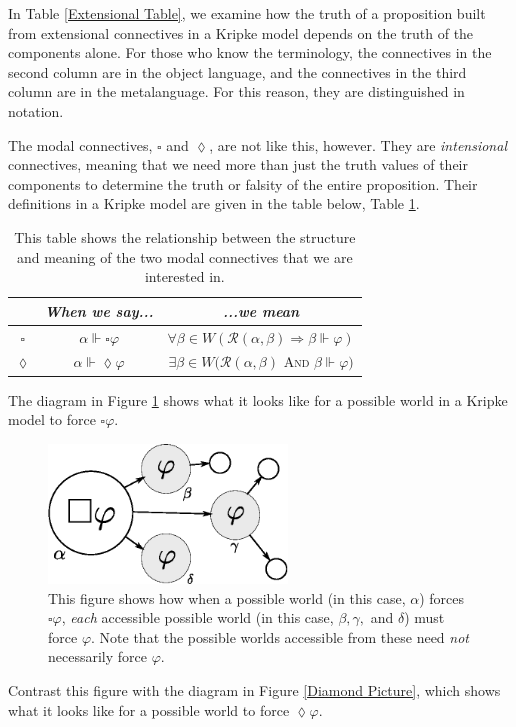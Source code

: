 \documentclass[12pt]{article}
\renewcommand{\phi}{\varphi}
\DeclareMathOperator{\forces}{\Vdash}
\begin{document}
In Table \ref{Extensional Table}, we examine how the truth of a proposition built from extensional connectives in a Kripke model depends on the
truth of the components alone. For those who know the terminology, the connectives in the second column are in the object language,
and the connectives in the third column are in the metalanguage. For this reason, they are distinguished in notation.

\bigskip

The modal connectives, $\square$ and $\lozenge$, are not like this, however. They are \emph{intensional} connectives, meaning that we need more than
just the truth values of their components to determine the truth or falsity of the entire proposition. Their definitions in a Kripke model are given
in the table below, Table \ref{Intensional Table}.

\begin{table}[h]
    \centering
    \begin{tabular}{| c | c | c |}
        \hline
        & \emph{When we say...}& \emph{...we mean} \\
        \hline
        $\square$ & $\alpha \forces \square \phi$ & $\forall \beta \in W(\mathcal{R}(\alpha, \beta) \Rightarrow \beta \forces \phi)$ \\
        \hline
        $\lozenge$ & $\alpha \forces \lozenge \phi$ & $\exists \beta \in W(\mathcal{R}(\alpha, \beta)$ \textsc{And} $\beta \forces \phi)$ \\
        \hline
    \end{tabular}
    \caption{This table shows the relationship between the structure and meaning of the two modal connectives that we are interested in.}
    \label{Intensional Table}
\end{table}

The diagram in Figure \ref{Box Picture} shows what it looks like for a possible world in a Kripke model to force $\square \phi$. 
\begin{figure}[H]
    \centering
    \includegraphics[width=2.5in]{box.eps}
    \caption{This figure shows how when a possible world (in this case, $\alpha$) forces $\square \phi$, \emph{each} accessible possible world 
    (in this case, $\beta, \gamma,$ and  $\delta$) must
    force $\phi$. Note that the possible worlds accessible from these need \emph{not} necessarily force $\phi$.}
    \label{Box Picture}
\end{figure}
Contrast this figure with the diagram in Figure \ref{Diamond Picture}, which shows what it looks like for a possible world to force $\lozenge \phi$.
\end{document}
